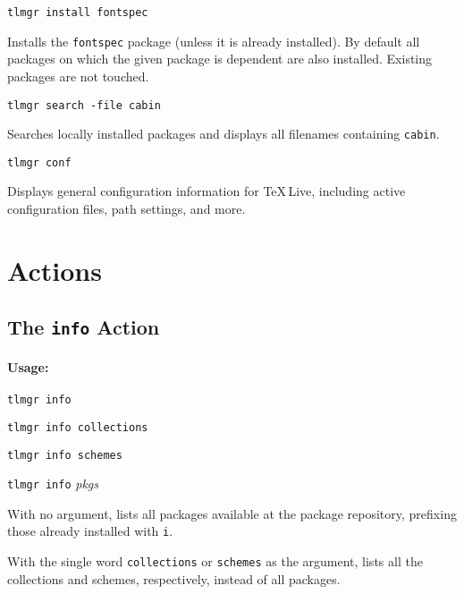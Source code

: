 \documentclass[11pt]{article}
\begin{document}
\begin{description}
\item\texttt{tlmgr install fontspec}\par 

Installs the \texttt{fontspec} package (unless it is already
installed). By default all packages on which the given
package is dependent are also installed. Existing packages
are not touched.

\item\texttt{tlmgr search -file cabin}\par 

Searches locally installed packages and displays all filenames
containing \texttt{cabin}.

\item\texttt{tlmgr conf}\par

Displays general configuration information for \TeX\,Live, including active configuration files, path settings, and more. 

\end{description}

\clearpage

\section{Actions}
\label{Actions}

\subsection{The {\tt info} Action}
\label{info}

\paragraph{Usage:}

\begin{list}{}{}
\item \texttt{tlmgr info} 
\item \texttt{tlmgr info collections} 
\item \texttt{tlmgr info schemes}
\item \texttt{tlmgr info} \textsl{pkgs} 
\end{list}

With no argument, lists all packages available at the
package repository, prefixing those already installed with
\texttt{i}.

With the single word \texttt{collections} or
\texttt{schemes} as the argument, lists all the collections
and schemes, respectively, instead of all packages.
\end{document}
